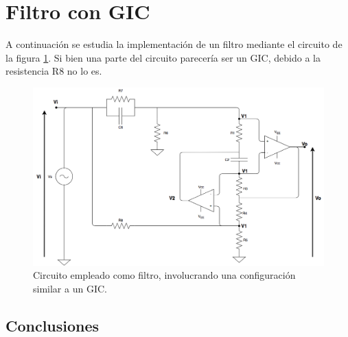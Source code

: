 
\section{Filtro con GIC}

A continuaci\'on se estudia la implementaci\'on de un filtro mediante el circuito de la figura \ref{circ1}. Si bien una parte del circuito parecer\'ia ser un GIC, debido a la resistencia R8 no lo es.

\begin{figure}[H] %
	\centering
	\includegraphics[scale=0.4]{../EJ1/circuito1.png}
	\caption{Circuito empleado como filtro, involucrando una configuraci\'on similar a un GIC.}
	\label{circ1}
\end{figure}













\subsection{Conclusiones}

